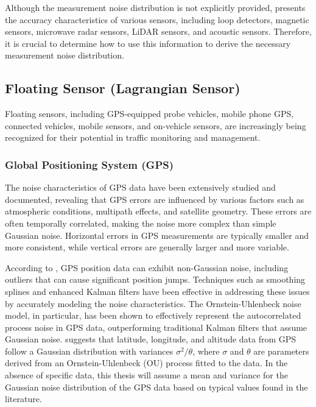 Although the measurement noise distribution is not explicitly provided, \textcite{klein2024roadside} presents the accuracy characteristics of various sensors, including loop detectors, magnetic sensors, microwave radar sensors, LiDAR sensors, and acoustic sensors. Therefore, it is crucial to determine how to use this information to derive the necessary measurement noise distribution.


\subsection{Floating Sensor (Lagrangian Sensor)}
Floating sensors, including GPS-equipped probe vehicles, mobile phone GPS, connected vehicles, mobile sensors, and on-vehicle sensors, are increasingly being recognized for their potential in traffic monitoring and management. 

\subsubsection{Global Positioning System (GPS)}\label{Global Positioning System (GPS)}
The noise characteristics of GPS data have been extensively studied and documented, revealing that GPS errors are influenced by various factors such as atmospheric conditions, multipath effects, and satellite geometry. These errors are often temporally correlated, making the noise more complex than simple Gaussian noise. Horizontal errors in GPS measurements are typically smaller and more consistent, while vertical errors are generally larger and more variable.

According to \textcite{early2020smoothing}, GPS position data can exhibit non-Gaussian noise, including outliers that can cause significant position jumps. Techniques such as smoothing splines and enhanced Kalman filters have been effective in addressing these issues by accurately modeling the noise characteristics. The Ornstein-Uhlenbeck noise model, in particular, has been shown to effectively represent the autocorrelated process noise in GPS data, outperforming traditional Kalman filters that assume Gaussian noise. \textcite{martin2020improving} suggests that latitude, longitude, and altitude data from GPS follow a Gaussian distribution with variances \(\sigma^2/\theta\), where \(\sigma\) and \(\theta\) are parameters derived from an Ornstein-Uhlenbeck (OU) process fitted to the data. In the absence of specific data, this thesis will assume a mean and variance for the Gaussian noise distribution of the GPS data based on typical values found in the literature. 






